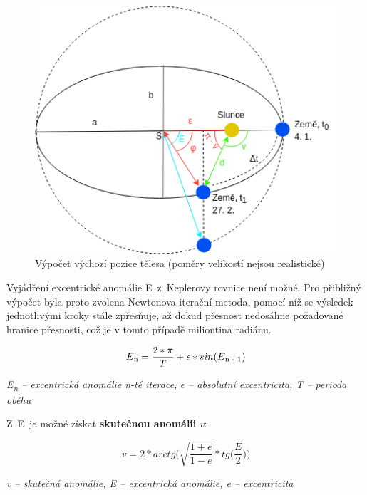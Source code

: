 \documentclass[a4paper,12pt]{article}
\begin{document}
\begin{figure}[H]
\begin{center}
\includegraphics[width=350pt]{Images/Initial.png}
\caption[Výpočet výchozí pozice tělesa]{Výpočet výchozí pozice tělesa (poměry velikostí nejsou realistické) \footnotemark[1]}
\end{center}
\end{figure}


\vspace*{-0.5cm}
Vyjádření excentrické anomálie E~z~Keplerovy rovnice není možné. Pro přibližný výpočet byla proto zvolena Newtonova iterační metoda, pomocí níž se výsledek jednotlivými kroky stále zpřesňuje, až dokud přesnost nedosáhne požadované hranice přesnosti, což je v tomto případě miliontina radiánu.

\vspace*{-0.5cm}
$$E\textsubscript{n} = \frac{2 * \pi}{T} + \epsilon * sin(E\textsubscript{n - 1})$$
\begin{center}
\textit{E\textsubscript{n} -- excentrická anomálie n-té iterace, $\epsilon$ -- absolutní excentricita, T -- perioda oběhu}~\cite{michalrepik}
\end{center}

Z~E~je možné získat \textbf{skutečnou anomálii} \textit{v}:

\vspace*{-0.5cm}
$$v = 2 * arctg\Bigg(\sqrt{\frac{1 + e}{1 - e}} * tg\bigg(\frac{E}{2}\bigg)\Bigg)$$
\begin{center}
\textit{v -- skutečná anomálie, E -- excentrická anomálie, e -- excentricita}~\cite{michalrepik}
\end{center}
\end{document}
